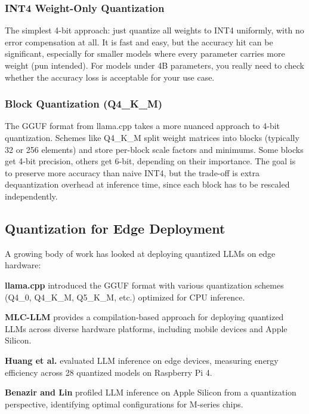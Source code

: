 \documentclass[11pt,a4paper]{article}
\begin{document}
\subsubsection{INT4 Weight-Only Quantization}

The simplest 4-bit approach: just quantize all weights to INT4 uniformly, with no error compensation at all. It is fast and easy, but the accuracy hit can be significant, especially for smaller models where every parameter carries more weight (pun intended). For models under 4B parameters, you really need to check whether the accuracy loss is acceptable for your use case.

\subsubsection{Block Quantization (Q4\_K\_M)}

The GGUF format from llama.cpp \cite{llamacpp2023} takes a more nuanced approach to 4-bit quantization. Schemes like Q4\_K\_M split weight matrices into blocks (typically 32 or 256 elements) and store per-block scale factors and minimums. Some blocks get 4-bit precision, others get 6-bit, depending on their importance. The goal is to preserve more accuracy than naive INT4, but the trade-off is extra dequantization overhead at inference time, since each block has to be rescaled independently.

\subsection{Quantization for Edge Deployment}

A growing body of work has looked at deploying quantized LLMs on edge hardware:

\textbf{llama.cpp} \cite{llamacpp2023} introduced the GGUF format with various quantization schemes (Q4\_0, Q4\_K\_M, Q5\_K\_M, etc.) optimized for CPU inference.

\textbf{MLC-LLM} \cite{mlcllm2023} provides a compilation-based approach for deploying quantized LLMs across diverse hardware platforms, including mobile devices and Apple Silicon.

\textbf{Huang et al.} \cite{huang2025llms} evaluated LLM inference on edge devices, measuring energy efficiency across 28 quantized models on Raspberry Pi 4.

\textbf{Benazir and Lin} \cite{benazir2025profiling} profiled LLM inference on Apple Silicon from a quantization perspective, identifying optimal configurations for M-series chips.
\end{document}
